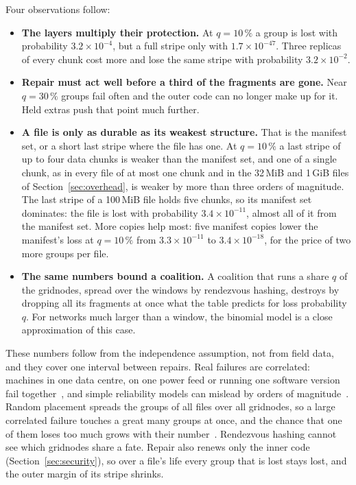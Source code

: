 \documentclass[10pt,a4paper,final]{article}
\begin{document}
Four observations follow:

\begin{itemize}
	\item \textbf{The layers multiply their protection.} At $q = 10\,\%$ a group is lost with probability
	      $3.2 \times 10^{-4}$, but a full stripe only with $1.7 \times 10^{-47}$. Three replicas of every chunk
	      cost more and lose the same stripe with probability $3.2 \times 10^{-2}$.
	\item \textbf{Repair must act well before a third of the fragments are gone.} Near $q = 30\,\%$ groups fail
	      often and the outer code can no longer make up for it. Held extras push that point much further.
	\item \textbf{A file is only as durable as its weakest structure.} That is the manifest set, or a short last
	      stripe where the file has one. At $q = 10\,\%$ a last stripe of up to four data chunks is weaker than the
	      manifest set, and one of a single chunk, as in every file of at most one chunk and in the 32\,MiB and
	      1\,GiB files of Section~\ref{sec:overhead}, is weaker by more than three orders of magnitude. The last
	      stripe of a 100\,MiB file holds five chunks, so its manifest set dominates: the file is lost with
	      probability $3.4 \times 10^{-11}$, almost all of it from the manifest set. More copies help most: five
	      manifest copies lower the manifest's loss at $q = 10\,\%$ from $3.3 \times 10^{-11}$ to $3.4 \times
	      10^{-18}$, for the price of two more groups per file.
	\item \textbf{The same numbers bound a coalition.} A coalition that runs a share $q$ of the gridnodes, spread
	      over the windows by rendezvous hashing, destroys by dropping all its fragments at once what the table
	      predicts for loss probability $q$. For networks much larger than a window, the binomial model is a close
	      approximation of this case.
\end{itemize}

These numbers follow from the independence assumption, not from field data, and they cover one interval between
repairs. Real failures are correlated: machines in one data centre, on one power feed or running one software
version fail together~\cite{ford2010,nath2006}, and simple reliability models can mislead by orders of
magnitude~\cite{greenan2010}. Random placement spreads the groups of all files over all gridnodes, so a large
correlated failure touches a great many groups at once, and the chance that one of them loses too much grows with
their number~\cite{cidon2013}. Rendezvous hashing cannot see which gridnodes share a fate.
Repair also renews only the inner code (Section~\ref{sec:security}), so over a file's life every group that is lost
stays lost, and the outer margin of its stripe shrinks.
\end{document}
